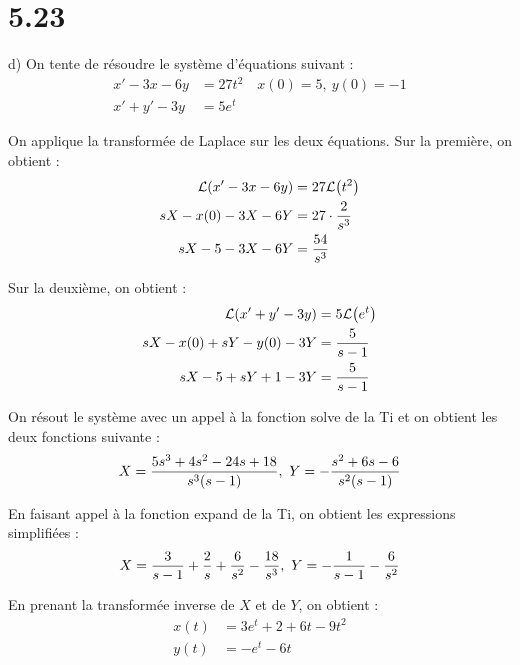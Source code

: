 \section*{5.23}

d) On tente de résoudre le système d'équations suivant :
\begin{align*}
    x' - 3x - 6y &= 27t^2\quad x(0)=5,\ y(0)=-1 \\
    x' + y' - 3y &= 5 e^{t}
\end{align*}

On applique la transformée de Laplace sur les deux équations. Sur la première,
on obtient :
\begin{align*}
    \mathcal{L}{\left({x'-3x-6y}\right)} &= 27 \mathcal{L}{\left({t^2}\right)} \\
    sX-x(0)-3X-6Y &= 27\cdot \dfrac{2}{s^3} \\
    sX-5-3X-6Y &= \dfrac{54}{s^3}
\end{align*}

Sur la deuxième, on obtient :
\begin{align*}
    \mathcal{L}{\left({x'+y'-3y}\right)} &= 5 \mathcal{L}{\left({e^{t}}\right)} \\
    sX-x(0)+sY-y(0)-3Y &= \dfrac{5}{s-1} \\
    sX-5+sY+1-3Y &= \dfrac{5}{s-1}
\end{align*}

On résout le système avec un appel à la fonction solve de la Ti et on obtient
les deux fonctions suivante :
\begin{align*}
    X = \f{5s^3+4s^2-24s+18}{s^3(s-1)},\ 
    Y = -\f{s^2+6s-6}{s^2(s-1)}
\end{align*}

En faisant appel à la fonction expand de la Ti, on obtient les expressions
simplifiées :
\begin{align*}
    X = \f{3}{s-1}+\f{2}{s}+\f{6}{s^2}-\f{18}{s^3},\ 
    Y = -\f{1}{s-1}-\f{6}{s^2}
\end{align*}

En prenant la transformée inverse de $X$ et de $Y$, on obtient :
\begin{align*}
    x(t) &= 3 e^{t}+2+6t-9t^2 \\
    y(t) &= -e^{t}-6t
\end{align*}
